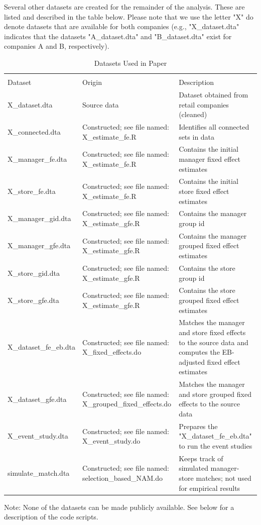 \documentclass[
]{article}
\begin{document}
Several other datasets are created for the remainder of the analysis. These are listed and described in the table below. Please note that we use the letter "X" do denote datasets that are available for both companies (e.g., "X\_dataset.dta" indicates that the datasets "A\_dataset.dta" and "B\_dataset.dta" exist for companies A and B, respectively).
\begin{table}[h]
    \begin{center}
    \caption{Datasets Used in Paper}\label{tab:placeholder}
    \begin{tabular}{lp{4.5cm}p{6cm}} \toprule \\
        Dataset & Origin & Description \\ \hline
        X\_dataset.dta & Source data & Dataset obtained from retail companies (cleaned) \\
        X\_connected.dta & Constructed; see file named: X\_estimate\_fe.R & Identifies all connected sets in data \\
        X\_manager\_fe.dta & Constructed; see file named: X\_estimate\_fe.R & Contains the initial manager fixed effect estimates \\
        X\_store\_fe.dta & Constructed; see file named: X\_estimate\_fe.R & Contains the initial store fixed effect estimates \\
        X\_manager\_gid.dta & Constructed; see file named: X\_estimate\_gfe.R & Contains the manager group id \\
        X\_manager\_gfe.dta & Constructed; see file named: X\_estimate\_gfe.R & Contains the manager grouped fixed effect estimates \\
        X\_store\_gid.dta & Constructed; see file named: X\_estimate\_gfe.R & Contains the store group id \\
        X\_store\_gfe.dta & Constructed; see file named: X\_estimate\_gfe.R & Contains the store grouped fixed effect estimates \\
        X\_dataset\_fe\_eb.dta & Constructed; see file named: X\_fixed\_effects.do & Matches the manager and store fixed effects to the source data and computes the EB-adjusted fixed effect estimates \\ 
        X\_dataset\_gfe.dta & Constructed; see file named: X\_grouped\_fixed\_effects.do & Matches the manager and store grouped fixed effects to the source data \\
        X\_event\_study.dta & Constructed; see file named: X\_event\_study.do & Prepares the "X\_dataset\_fe\_eb.dta" to run the event studies \\
        simulate\_match.dta & Constructed; see file named: selection\_based\_NAM.do & Keeps track of simulated manager-store matches; not used for empirical results \\
        \bottomrule
    \end{tabular}
    \end{center}
    \noindent \footnotesize Note: None of the datasets can be made publicly available. See below for a description of the code scripts.
\end{table}
\end{document}
